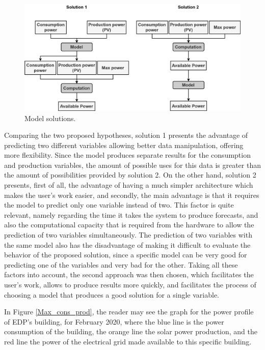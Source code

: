 \begin{figure}[h!]
    \centering
    \begin{center}
    \includegraphics[width=1\textwidth]{Images/Available.png}
    \caption{Model solutions.}
    \label{avsol}
    \end{center}
\end{figure}

Comparing the two proposed hypotheses, solution 1 presents the advantage of predicting two different variables allowing better data manipulation, offering more flexibility. Since the model produces separate results for the consumption and production variables, the amount of possible uses for this data is greater than the amount of possibilities provided by solution 2. On the other hand, solution 2 presents, first of all, the advantage of having a much simpler architecture which makes the user's work easier, and secondly, the main advantage is that it requires the model to predict only one variable instead of two. This factor is quite relevant, namely regarding the time it takes the system to produce forecasts, and also the computational capacity that is required from the hardware to allow the prediction of two variables simultaneously. The prediction of two variables with the same model also has the disadvantage of making it difficult to evaluate the behavior of the proposed solution, since a specific model can be very good for predicting one of the variables and very bad for the other. 
Taking all these factors into account, the second approach was then chosen, which facilitates the user's work, allows to produce results more quickly, and facilitates the process of choosing a model that produces a good solution for a single variable.


In Figure \ref{Max_cons_prod}, the reader may see the graph for the power profile of \ac{EDP}’s building, for February 2020, where the blue line is the power consumption of the building, the orange line the solar power production, and the red line the power of the electrical grid made available to this specific building.


